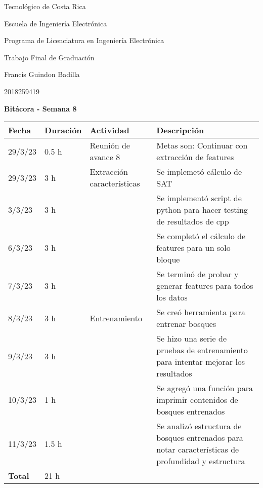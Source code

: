 \documentclass[12pt,oneside]{book}
\begin{document}
 \graphicspath{{./}{../tesis/fig/}}
  Tecnológico de Costa Rica
  \par\vspace{1mm}
  Escuela de Ingeniería Electrónica
  \par\vspace{1mm}
  Programa de Licenciatura en Ingeniería Electrónica
  \par\vspace{10mm}
  Trabajo Final de Graduación
  \par\vspace{1mm}
  Francis Guindon Badilla
  \par\vspace{1mm}
  2018259419
  \par\vspace{10mm}
  \large\textbf{Bitácora - Semana 8}
  \par\vspace{10mm}
  \small

  \begin{table} [!h]
    \centering
    \small
    \begin{tabular}{p{1.5 cm} p{2.1 cm} p{5 cm} p{8 cm}}
      \hline
      Fecha & Duración & Actividad & Descripción \\
      \hline
      29/3/23 & 0.5 h & Reunión de avance 8 & Metas son: Continuar con extracción de features \\
      29/3/23 & 3 h & Extracción características & Se implemetó cálculo de SAT \\
      3/3/23 & 3 h & & Se implementó script de python para hacer testing de resultados de cpp \\
      6/3/23 & 3 h & & Se completó el cálculo de features para un solo bloque \\
      7/3/23 & 3 h & & Se terminó de probar y generar features para todos los datos \\
      8/3/23 & 3 h & Entrenamiento & Se creó herramienta para entrenar bosques \\
      9/3/23 & 3 h & & Se hizo una serie de pruebas de entrenamiento para intentar mejorar los resultados \\
      10/3/23 & 1 h & & Se agregó una función para imprimir contenidos de bosques entrenados \\
      11/3/23 & 1.5 h & & Se analizó estructura de bosques entrenados para notar características de profundidad y estructura \\
      \hline
      \textbf{Total} & 21 h \\
      \hline
    \end{tabular}
  \end{table}
  
\end{document}
